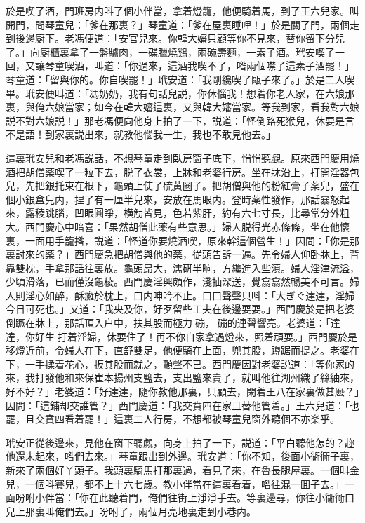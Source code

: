 於是喫了酒，門班房内呌了個小伴當，拿着燈籠，他便騎着馬，到了王六兒家。叫開門，問琴童兒：「爹在那裏？」琴童道：「爹在屋裏睡哩！」於是關了門，兩個走到後邊廚下。老馮便道：「安官兒來。你韓大嬸只顧等你不見來，替你留下分兒了。」向廚櫃裏拿了一盤驢肉，一碟臘燒鷄，兩碗壽麵，一素子酒。玳安喫了一回，又讓琴童喫酒，叫道：「你過來，這酒我喫不了，喒兩個噤了這素子酒罷！」琴童道：「留與你的。你自喫罷！」玳安道：「我剛纔喫了甌子來了。」於是二人喫畢。玳安便叫道：「馮奶奶，我有句話兒説，你休惱我！想着你老人家，在六娘那裏，與俺六娘當家；如今在韓大嬸這裏，又與韓大嬸當家。等我到家，看我對六娘説不對六娘説！」那老馮便向他身上拍了一下，説道：「怪倒路死猴兒，休要是言不是語！到家裏説出來，就教他惱我一生，我也不敢見他去。」

這裏玳安兒和老馮説話，不想琴童走到臥房窗子底下，悄悄聽覷。原來西門慶用燒酒把胡僧薬喫了一粒下去，脱了衣裳，上牀和老婆行房。坐在牀沿上，打開淫器包兒，先把銀托束在根下，龜頭上使了硫黄圈子。把胡僧與他的粉紅膏子薬兒，盛在個小銀盒兒内，捏了有一厘半兒來，安放在馬眼内。登時薬性發作，那話暴怒起來，露稜跳腦，凹眼圓睜，横觔皆見，色若紫肝，約有六七寸長，比尋常分外粗大。西門慶心中暗喜：「果然胡僧此薬有些意思。」婦人脱得光赤條條，坐在他懷裏，一面用手籠揝，説道：「怪道你要燒酒喫，原來幹這個營生！」因問：「你是那裏討來的薬？」西門慶急把胡僧與他的薬，従頭告訴一遍。先令婦人仰卧牀上，背靠雙枕，手拿那話往裏放。龜頭昂大，濡硏半晌，方纔進入些湏。婦人淫津流溢，少頃滑落，已而僅沒龜稜。西門慶淫興頗作，淺抽深送，覺翕翕然暢美不可言。婦人則淫心如醉，酥癱於枕上，口内呻吟不止。口口聲聲只呌：「大ぎぐ達達，淫婦今日可死也。」又道：「我央及你，好歹留些工夫在後邊耍耍。」西門慶於是把老婆倒蹶在牀上，那話頂入户中，扶其股而極力𢵞磞，𢵞磞的連聲響亮。老婆道：「達達，你好生𢵞打着淫婦，休要住了！再不你自家拿過燈來，照着頑耍。」西門慶於是移燈近前，令婦人在下，直舒雙足，他便騎在上面，兜其股，蹲踞而提之。老婆在下，一手揉着花心，扳其股而就之，顫聲不已。西門慶因對老婆説道：「等你家的來，我打發他和來保崔本揚州支鹽去，支出鹽來賣了，就叫他往湖州織了絲紬來，好不好？」老婆道：「好達達，隨你教他那裏，只顧去，閑着王八在家裏做甚麽？」因問：「這鋪却交誰管？」西門慶道：「我交賁四在家且替他管着。」王六兒道：「也罷，且交賁四看着罷！」這裏二人行房，不想都被琴童兒窗外聽個不亦楽乎。

玳安正從後邊來，見他在窗下聽覷，向身上拍了一下，説道：「平白聽他怎的？趂他還未起來，喒們去來。」琴童跟出到外邊。玳安道：「你不知，後面小衚衕子裏，新來了兩個好丫頭子。我頭裏騎馬打那裏過，看見了來，在魯長腿屋裏。一個叫金兒，一個呌賽兒，都不上十六七歲。教小伴當在這裏看着，喒往混一囬子去。」一面吩咐小伴當：「你在此聽着門，俺們往街上淨淨手去。等裏邊尋，你往小衚衕口兒上那裏叫俺們去。」吩咐了，兩個月亮地裏走到小巷内。

